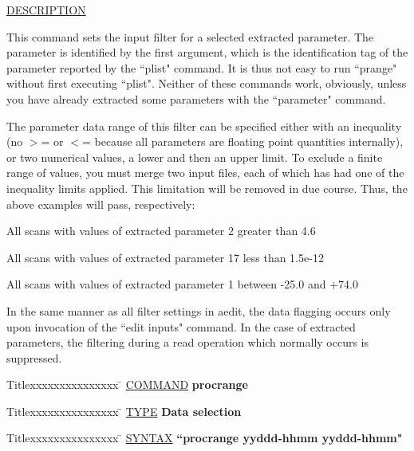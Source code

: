 \underline{DESCRIPTION}
\begin{list}{}{\setlength{\leftmargin}{0.5in}
     \setlength{\rightmargin}{0in}}
\item
This command sets the input filter for a selected extracted parameter.  The
parameter is identified by the first argument, which is the identification tag
of the parameter reported by the ``plist" command.  It is thus not easy to run
``prange" without first executing ``plist".  Neither of these commands work,
obviously, unless you have already extracted some parameters with the
``parameter" command.
\item
The parameter data range of this filter can be specified either with an inequality
(no $>$= or $<$= because all parameters are floating point quantities internally),
or two numerical values, a lower and then an upper limit.  To exclude a finite
range of values, you must merge two input files, each of which has had one of
the inequality limits applied.  This limitation will be removed in due course.
Thus, the above examples will pass, respectively:
\item
All scans with values of extracted parameter 2 greater than 4.6
\item
All scans with values of extracted parameter 17 less than 1.5e-12
\item
All scans with values of extracted parameter 1 between -25.0 and +74.0
\item
In the same manner as all filter settings in aedit, the data flagging occurs only
upon invocation of the ``edit inputs" command.  In the case of extracted
parameters, the filtering during a read operation which normally occurs is
suppressed.
\end{list}
\vspace{.2in}

\begin{tabbing}
Titlexxxxxxxxxxxxxxx \= \kill
\underline{COMMAND} \> {\bf 	procrange} \\
\end{tabbing}

\begin{tabbing}
Titlexxxxxxxxxxxxxxx \= \kill
\underline{TYPE} \> {\bf 		Data selection} \\
\end{tabbing}

\begin{tabbing}
Titlexxxxxxxxxxxxxxx \= \kill
\underline{SYNTAX} \> {\bf 		``procrange yyddd-hhmm yyddd-hhmm"} \\
\end{tabbing}

